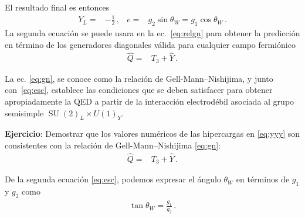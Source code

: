 El resultado final es entonces
\begin{align}
\label{eq:esc}
 Y_L=&-\frac{1}{2}\,,&   e=&g_2\sin\theta_W=g_1 \cos\theta_W\,.
\end{align}
La segunda ecuación se puede usara en la ec.~\eqref{eq:relgn} para obtener la predicción en término de los generadores diagonales válida para cualquier campo fermiónico
\begin{align}
\label{eq:gn}
 \widehat{Q}=&T_3+\widehat{Y}\,.
\end{align}

La ec. \eqref{eq:gn}, se conoce como la relación de Gell-Mann--Nishijima, y junto con~\eqref{eq:esc}, establece las condiciones que se deben satisfacer para obtener apropiadamente la QED a partir de la interacción electrodébil asociada al grupo semisimple $\operatorname{SU}(2)_L\times  U(1)_Y$.

\noindent
\textbf{Ejercicio}: Demostrar que los valores numéricos de las hipercargas en \eqref{eq:yyy} son consistentes con la relación de Gell-Mann--Nishijima \eqref{eq:gn}:
\begin{align}
 \widehat{Q}=&T_3+\widehat{Y}\,.
\end{align}


De la segunda ecuación  \eqref{eq:esc}, podemos expresar el ángulo $\theta_W$ en términos de $g_1$ y $g_2$ como
\begin{align}
\label{eq:twa}
  \tan\theta_W=\frac{g_1}{g_2}\,.
\end{align}


